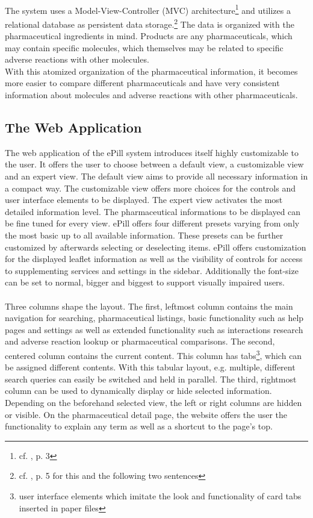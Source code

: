 \\
The system uses a Model-View-Controller (MVC) architecture\footnote{cf. \cite{Dehling.2012}, p. 3} and utilizes a relational database as persistent data storage.\footnote{cf. \cite{Dehling.2012}, p. 5 for this and the following two sentences} The data is organized with the pharmaceutical ingredients in mind. Products are any pharmaceuticals, which may contain specific molecules, which themselves may be related to specific adverse reactions with other molecules. 
\\
With this atomized organization of the pharmaceutical information, it becomes more easier to compare different pharmaceuticals and have very consistent information about molecules and adverse reactions with other pharmaceuticals.

\subsection{The Web Application}
The web application of the ePill system introduces itself highly customizable to the user. It offers the user to choose between a default view, a customizable view and an expert view. The default view aims to provide all necessary information in a compact way. The customizable view offers more choices for the controls and user interface elements to be displayed. The expert view activates the most detailed information level. The pharmaceutical informations to be displayed can be fine tuned for every view. ePill offers four different presets varying from only the most basic up to all available information. These presets can be further customized by afterwards selecting or deselecting items. ePill offers customization for the displayed leaflet information as well as the visibility of controls for access to supplementing services and settings in the sidebar. Additionally the font-size can be set to normal, bigger and biggest to support visually impaired users.
\\
\\
Three columns shape the layout. The first, leftmost column contains the main navigation for searching, pharmaceutical listings, basic functionality such as help pages and settings as well as extended functionality such as interactions research and adverse reaction lookup or pharmaceutical comparisons. The second, centered column contains the current content. This column has tabs\footnote{user interface elements which imitate the look and functionality of card tabs inserted in paper files}, which can be assigned different contents. With this tabular layout, e.g. multiple, different search queries can easily be switched and held in parallel. The third, rightmost column can be used to dynamically display or hide selected information. Depending on the beforehand selected view, the left or right columns are hidden or visible. On the pharmaceutical detail page, the website offers the user the functionality to explain any term as well as a shortcut to the page's top.

